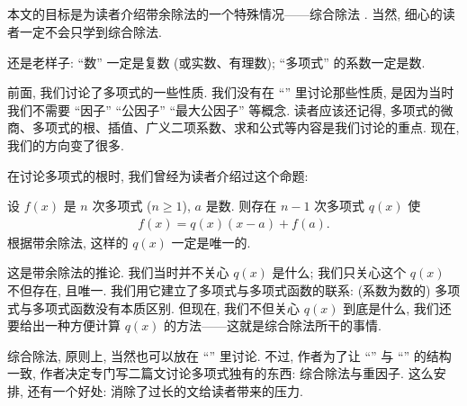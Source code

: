 \subsection*{\SyntheticDivision}
\markright{\SyntheticDivision}

本文的目标是为读者介绍带余除法的一个特殊情况——综合除法 . 当然, 细心的读者一定不会只学到综合除法.

还是老样子: ``数'' 一定是复数 (或实数、有理数); ``多项式'' 的系数一定是数.

前面, 我们讨论了多项式的一些性质. 我们没有在 ``\HEADING '' 里讨论那些性质, 是因为当时我们不需要 ``因子'' ``公因子'' ``最大公因子'' 等概念. 读者应该还记得, 多项式的微商、多项式的根、插值、广义二项系数、求和公式等内容是我们讨论的重点. 现在, 我们的方向变了很多.

在讨论多项式的根时, 我们曾经为读者介绍过这个命题:
\begin{proposition}
    设 $f(x)$ 是 $n$ 次多项式 ($n \geq 1$), $a$ 是数. 则存在 $n-1$ 次多项式 $q(x)$ 使
    \begin{align*}
        f(x) = q(x) (x-a) + f(a).
    \end{align*}
    根据带余除法, 这样的 $q(x)$ 一定是唯一的.
\end{proposition}

这是带余除法的推论. 我们当时并不关心 $q(x)$ 是什么; 我们只关心这个 $q(x)$ 不但存在, 且唯一. 我们用它建立了多项式与多项式函数的联系: (系数为数的) 多项式与多项式函数没有本质区别. 但现在, 我们不但关心 $q(x)$ 到底是什么, 我们还要给出一种方便计算 $q(x)$ 的方法——这就是综合除法所干的事情.

综合除法, 原则上, 当然也可以放在 ``\SomePropertiesOfPolynomials '' 里讨论. 不过, 作者为了让 ``\SomePropertiesOfIntegers '' 与 ``\SomePropertiesOfPolynomials '' 的结构一致, 作者决定专门写二篇文讨论多项式独有的东西: 综合除法与重因子. 这么安排, 还有一个好处: 消除了过长的文给读者带来的压力.

